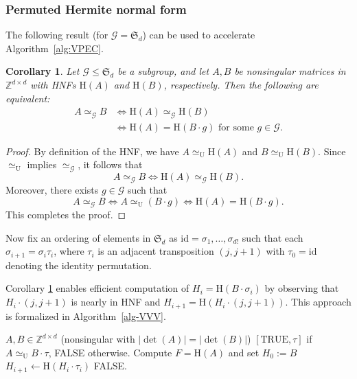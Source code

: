 \documentclass[reqno, 12pt]{article}
\newtheorem{cor}[thm]{Corollary}
\theoremstyle{mydefinition}
\theoremstyle{myremark}
\numberwithin{algorithm}{section}
\def\Z{\mathbb{Z}}
\newcommand{\h}{{\mathrm{H}}}
\begin{document}
\subsubsection{Permuted Hermite normal form}\label{sec-Permuted-Hermite-Normal-Form}
The following result (for $\mathcal G = \mathfrak{S}_d$) can be used to accelerate Algorithm~\ref{alg:VPEC}.

\begin{cor}\label{cor-HNF-eq}
  Let $\mathcal G \leq \mathfrak{S}_d$ be a subgroup, and let $A,B$ be nonsingular matrices in $\Z^{d\times d}$ with HNFs $\h(A)$ and $\h(B)$, respectively. Then the following are equivalent:
  \begin{align*}
    A \simeq_{\mathcal{G}} B &\iff \h(A) \simeq_{\mathcal{G}} \h(B) \\
    &\iff \h(A) = \h(B\cdot g) \text{ for some } g\in\mathcal{G}.
  \end{align*}
\end{cor}
\begin{proof}
By definition of the HNF, we have $A \simeq_{\mathrm{U}} \h(A)$ and $B \simeq_{\mathrm{U}} \h(B)$. Since $\simeq_{\mathrm{U}}$ implies $\simeq_{\mathcal{G}}$, it follows that
$$A \simeq_{\mathcal{G}} B \iff \h(A) \simeq_{\mathcal{G}} \h(B).$$
Moreover, there exists $g\in\mathcal{G}$ such that
$$A \simeq_{\mathcal{G}} B \iff A \simeq_{\mathrm{U}} (B\cdot g) \iff \h(A) = \h(B\cdot g).$$
This completes the proof.
\end{proof}

\def\id{\mathrm{id}}
Now fix an ordering of elements in $\mathfrak S_d$ as $\id = \sigma_1, \dots, \sigma_{d!}$ such that each $\sigma_{i+1}=\sigma_i \tau_i$, where $\tau_i$ is an adjacent transposition $(j, j+1)$ with $\tau_0=\id$ denoting the identity permutation.

Corollary \ref{cor-HNF-eq} enables efficient computation of $H_i = \h(B\cdot \sigma_{i})$ by observing that $H_i \cdot (j,j+1)$ is nearly in HNF and $H_{i+1}=\h(H_i \cdot (j,j+1))$. This approach is formalized in Algorithm~\ref{alg-VVV}.

\begin{algorithm}[h]
\caption{\texttt{EHEM} (Exhaustive Hermite Equivalence Method)}
\begin{algorithmic}[1]
\Require  $A, B \in \mathbb{Z}^{d \times d}$ (nonsingular with $|\det(A)|=|\det(B)|$)
\Ensure   $[\text{TRUE}, \tau]$ if $A\simeq_{\mathrm{U}} B\cdot\tau$, FALSE otherwise.
    \State   Compute $F=\h(A)$ and set $H_0:=B$
    \State  $H_{i+1} \gets \h(H_{i}\cdot \tau_i)$
     
    \EndIf
    \EndFor
\State \Return FALSE.
\end{algorithmic}\label{alg-VVV}
\end{algorithm}
\end{document}
